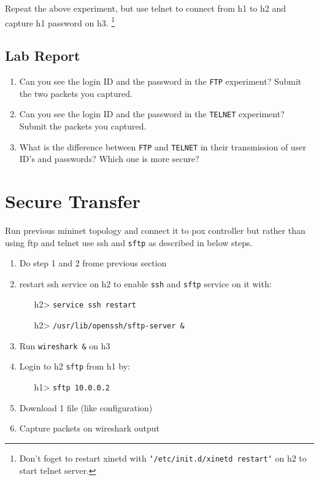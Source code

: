 \documentclass[10pt,a4paper]{article}
\numberwithin{equation}{section}
\numberwithin{figure}{section}
\numberwithin{table}{section}
\begin{document}
	Repeat the above experiment, but use telnet to connect from h1 to h2 and capture h1 password on h3. \footnote{Don't foget to restart xinetd with \texttt{`/etc/init.d/xinetd restart`} on h2 to start telnet server. }
	
	\subsection*{Lab Report}
	\begin{enumerate}
		\setlength{\itemindent}{0pt}
		\item Can you see the login ID and the password in the \texttt{FTP} experiment? Submit the two packets you captured.
		\item Can you see the login ID and the password in the \texttt{TELNET} experiment? Submit the packets you captured.
		\item What is the difference between \texttt{FTP} and \texttt{TELNET} in their transmission of user ID’s and passwords? Which one is more secure?
	\end{enumerate}
	
	\section{Secure Transfer}
	Run previous mininet topology and connect it to pox controller but rather than using ftp and telnet use ssh and \texttt{sftp} as described in below steps.
	
	\begin{enumerate}
		\setlength{\itemindent}{10pt}
		\item Do step 1 and 2 frome previous section
		\item restart ssh service on h2 to enable \texttt{ssh} and \texttt{sftp} service on it with:
		\begin{enumerate}
			\setlength{\itemindent}{10pt}
			\item [h2>] \texttt{service ssh restart}
			\item [h2>] \texttt{/usr/lib/openssh/sftp-server \&}
		\end{enumerate}
		\item Run \texttt{wireshark \&} on h3
		\item Login to h2 \texttt{sftp} from h1 by:
		\begin{enumerate}
			\setlength{\itemindent}{10pt}
			\item [h1>] \texttt{sftp 10.0.0.2}
		\end{enumerate}
		\item Download 1 file (like configuration)
		\item Capture packets on wireshark output
		
	\end{enumerate}
	
\end{document}
